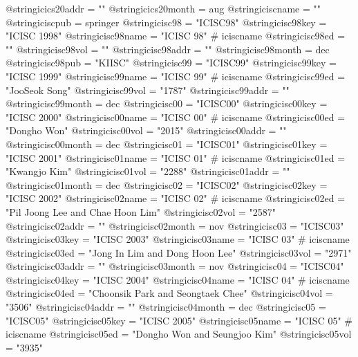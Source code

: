 @string{icics20addr =           ""}
@string{icics20month =          aug}
@string{iciscname =             ""}
@string{iciscpub =              springer}
@string{icisc98 =               "ICISC98"}
@string{icisc98key =            "ICISC 1998"}
@string{icisc98name =           "ICISC 98" # iciscname}
@string{icisc98ed =             ""}
@string{icisc98vol =            ""}
@string{icisc98addr =           ""}
@string{icisc98month =          dec}
@string{icisc98pub =            "KIISC"}
@string{icisc99 =               "ICISC99"}
@string{icisc99key =            "ICISC 1999"}
@string{icisc99name =           "ICISC 99" # iciscname}
@string{icisc99ed =             "JooSeok Song"}
@string{icisc99vol =            "1787"}
@string{icisc99addr =           ""}
@string{icisc99month =          dec}
@string{icisc00 =               "ICISC00"}
@string{icisc00key =            "ICISC 2000"}
@string{icisc00name =           "ICISC 00" # iciscname}
@string{icisc00ed =             "Dongho Won"}
@string{icisc00vol =            "2015"}
@string{icisc00addr =           ""}
@string{icisc00month =          dec}
@string{icisc01 =               "ICISC01"}
@string{icisc01key =            "ICISC 2001"}
@string{icisc01name =           "ICISC 01" # iciscname}
@string{icisc01ed =             "Kwangjo Kim"}
@string{icisc01vol =            "2288"}
@string{icisc01addr =           ""}
@string{icisc01month =          dec}
@string{icisc02 =               "ICISC02"}
@string{icisc02key =            "ICISC 2002"}
@string{icisc02name =           "ICISC 02" # iciscname}
@string{icisc02ed =             "Pil Joong Lee and Chae Hoon Lim"}
@string{icisc02vol =            "2587"}
@string{icisc02addr =           ""}
@string{icisc02month =          nov}
@string{icisc03 =               "ICISC03"}
@string{icisc03key =            "ICISC 2003"}
@string{icisc03name =           "ICISC 03" # iciscname}
@string{icisc03ed =             "Jong In Lim and Dong Hoon Lee"}
@string{icisc03vol =            "2971"}
@string{icisc03addr =           ""}
@string{icisc03month =          nov}
@string{icisc04 =               "ICISC04"}
@string{icisc04key =            "ICISC 2004"}
@string{icisc04name =           "ICISC 04" # iciscname}
@string{icisc04ed =             "Choonsik Park and Seongtaek Chee"}
@string{icisc04vol =            "3506"}
@string{icisc04addr =           ""}
@string{icisc04month =          dec}
@string{icisc05 =               "ICISC05"}
@string{icisc05key =            "ICISC 2005"}
@string{icisc05name =           "ICISC 05" # iciscname}
@string{icisc05ed =             "Dongho Won and Seungjoo Kim"}
@string{icisc05vol =            "3935"}

